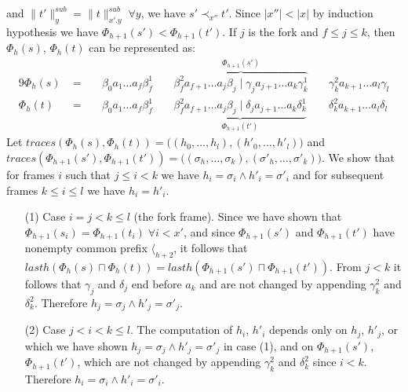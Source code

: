 \documentclass[AMA,STIX1COL]{WileyNJD-v2}
\newcommand{\Xl}{\langle}
\newcommand{\snorm}[2]{\|{#1}\|^{sub}_{#2}}
\begin{document}
\begin{proofEnd}
    and $\snorm{t'}{y} = \snorm{t}{x'.y} \;\forall y$,
    we have $s' \prec_{x''} t'$.
    Since $|x''| < |x|$ by induction hypothesis we have $\Phi_{h+1}(s') < \Phi_{h+1}(t')$.
    If $j$ is the fork and $f \leq j \leq k$, then
    $\Phi_{h}(s)$, $\Phi_{h}(t)$ can be represented as:
    \begin{alignat*}{9}
        \Phi_{h}(s)
            \;&=
                \;&& \beta_0 a_1 \dots a_f \beta_f^1
                \;&& \overbrace {\beta_f^2  a_{f+1} \dots a_j \beta_j \;\big|\; \gamma_j a_{j+1} \dots a_k \gamma_k^1}^{\Phi_{h+1}(s')}
                \;&& \gamma_k^2 a_{k+1} \dots a_l \gamma_l
                \\[-0.5em]
        \Phi_{h}(t)
            \;&=
                \;&& \beta_0 a_1 \dots a_f \beta_f^1
                \;&& \underbrace {\beta_f^2  a_{f+1} \dots a_j \beta_j \;\big|\; \delta_j a_{j+1} \dots a_k \delta_k^1}_{\Phi_{h+1}(t')}
                \;&& \delta_k^2 a_{k+1} \dots a_l \delta_l
    \end{alignat*}
    Let $traces (\Phi_{h}(s), \Phi_{h}(t)) = \big( (h_0, \dots, h_l), (h'_0, \dots, h'_l) \big)$
    and $traces (\Phi_{h+1}(s'), \Phi_{h+1}(t')) = \big( (\sigma_h, \dots, \sigma_k), (\sigma'_h, \dots, \sigma'_k) \big)$.
    We show that for frames $i$ such that $j \leq i < k$ we have
    $h_i = \sigma_i \wedge h'_i = \sigma'_i$
    and for subsequent frames $k \leq i \leq l$ we have $h_i = h'_i$.
    \begin{itemize}[itemsep=0.2em, topsep=0.5em]
    \item[(1)]
        Case $i = j < k \leq l$ (the fork frame).
        Since we have shown that $\Phi_{h+1}(s_i) = \Phi_{h+1}(t_i) \;\forall i < x'$,
        and since $\Phi_{h+1}(s')$ and $\Phi_{h+1}(t')$ have nonempty common prefix $\Xl_{h+2}$,
        it follows that $lasth (\Phi_{h}(s) \sqcap \Phi_{h}(t)) = lasth (\Phi_{h+1}(s') \sqcap \Phi_{h+1}(t'))$.
        From $j < k$ it follows that $\gamma_j$ and $\delta_j$ end before $a_k$
        and are not changed by appending $\gamma^2_k$ and $\delta^2_k$.
        Therefore $h_j = \sigma_j \wedge h'_j = \sigma'_j$.

    \item[(2)]
        Case $j < i < k \leq l$.
        The computation of $h_i$, $h'_i$ depends only on
        $h_j$, $h'_j$,
        or which we have shown $h_j = \sigma_j \wedge h'_j = \sigma'_j$ in case (1),
        and on $\Phi_{h+1}(s')$, $\Phi_{h+1}(t')$,
        which are not changed by appending $\gamma^2_k$ and $\delta^2_k$ since $i < k$.
        Therefore $h_i = \sigma_i \wedge h'_i = \sigma'_i$.


\end{itemize}
\end{proofEnd}
\end{document}
